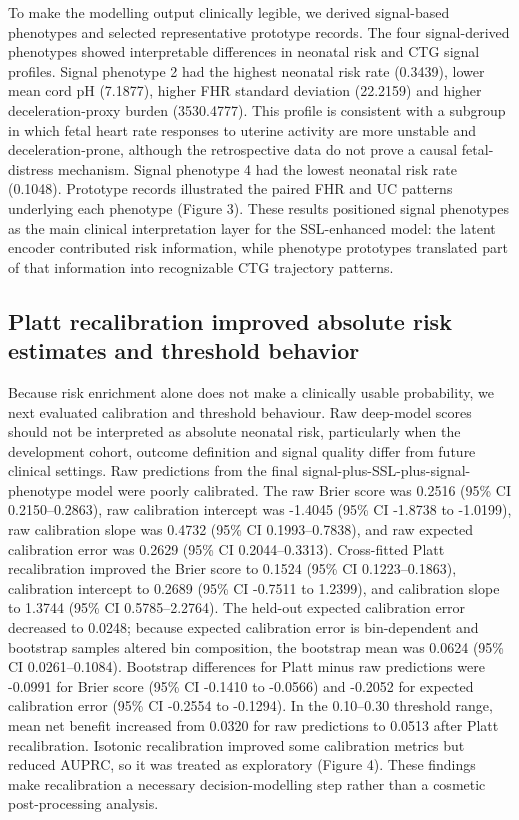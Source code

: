 \documentclass[11pt]{article}
\begin{document}
To make the modelling output clinically legible, we derived signal-based phenotypes and selected representative prototype records. The four signal-derived phenotypes showed interpretable differences in neonatal risk and CTG signal profiles. Signal phenotype 2 had the highest neonatal risk rate (0.3439), lower mean cord pH (7.1877), higher FHR standard deviation (22.2159) and higher deceleration-proxy burden (3530.4777). This profile is consistent with a subgroup in which fetal heart rate responses to uterine activity are more unstable and deceleration-prone, although the retrospective data do not prove a causal fetal-distress mechanism. Signal phenotype 4 had the lowest neonatal risk rate (0.1048). Prototype records illustrated the paired FHR and UC patterns underlying each phenotype (Figure 3). These results positioned signal phenotypes as the main clinical interpretation layer for the SSL-enhanced model: the latent encoder contributed risk information, while phenotype prototypes translated part of that information into recognizable CTG trajectory patterns.

\subsection{Platt recalibration improved absolute risk estimates and threshold behavior}

Because risk enrichment alone does not make a clinically usable probability, we next evaluated calibration and threshold behaviour. Raw deep-model scores should not be interpreted as absolute neonatal risk, particularly when the development cohort, outcome definition and signal quality differ from future clinical settings. Raw predictions from the final signal-plus-SSL-plus-signal-phenotype model were poorly calibrated. The raw Brier score was 0.2516 (95\% CI 0.2150--0.2863), raw calibration intercept was -1.4045 (95\% CI -1.8738 to -1.0199), raw calibration slope was 0.4732 (95\% CI 0.1993--0.7838), and raw expected calibration error was 0.2629 (95\% CI 0.2044--0.3313). Cross-fitted Platt recalibration improved the Brier score to 0.1524 (95\% CI 0.1223--0.1863), calibration intercept to 0.2689 (95\% CI -0.7511 to 1.2399), and calibration slope to 1.3744 (95\% CI 0.5785--2.2764). The held-out expected calibration error decreased to 0.0248; because expected calibration error is bin-dependent and bootstrap samples altered bin composition, the bootstrap mean was 0.0624 (95\% CI 0.0261--0.1084). Bootstrap differences for Platt minus raw predictions were -0.0991 for Brier score (95\% CI -0.1410 to -0.0566) and -0.2052 for expected calibration error (95\% CI -0.2554 to -0.1294). In the 0.10--0.30 threshold range, mean net benefit increased from 0.0320 for raw predictions to 0.0513 after Platt recalibration. Isotonic recalibration improved some calibration metrics but reduced AUPRC, so it was treated as exploratory (Figure 4). These findings make recalibration a necessary decision-modelling step rather than a cosmetic post-processing analysis.
\end{document}
